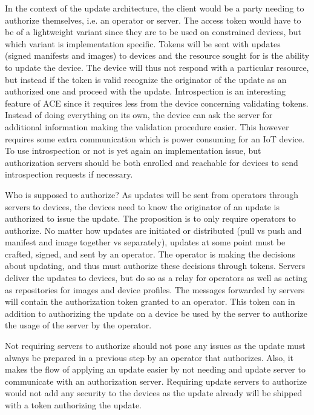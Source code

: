 \documentclass[0-thesis.tex]{subfiles}
\begin{document}
In the context of the update architecture, the client would be a party needing to
authorize themselves, i.e. an operator or server. The access token would have to be of a
lightweight variant since they are to be used on constrained devices, but which variant is
implementation specific. Tokens will be sent with updates (signed manifests and images) to
devices and the resource sought for is the ability to update the device. The device will
thus not respond with a particular resource, but instead if the token is valid recognize
the originator of the update as an authorized one and proceed with the update.
Introspection is an interesting feature of ACE since it requires less from the device
concerning validating tokens. Instead of doing everything on its own, the device can ask
the server for additional information making the validation procedure easier. This however
requires some extra communication which is power consuming for an IoT device. To use
introspection or not is yet again an implementation issue, but authorization servers
should be both enrolled and reachable for devices to send introspection requests if
necessary.

Who is supposed to authorize? As updates will be sent from operators through servers to
devices, the devices need to know the originator of an update is authorized to issue the
update. The proposition is to only require operators to authorize. No matter how updates
are initiated or distributed (pull vs push and manifest and image together vs separately),
updates at some point must be crafted, signed, and sent by an operator. The operator is
making the decisions about updating, and thus must authorize these decisions through
tokens. Servers deliver the updates to devices, but do so as a relay for operators as
well as acting as repositories for images and device profiles. The messages forwarded by
servers will contain the authorization token granted to an operator. This token can in
addition to authorizing the update on a device be used by the server to authorize the
usage of the server by the operator. 

Not requiring servers to authorize should not pose any issues as the update must always be
prepared in a previous step by an operator that authorizes. Also, it makes the flow of
applying an update easier by not needing and update server to communicate with an
authorization server. Requiring update servers to authorize would not add any security to
the devices as the update already will be shipped with a token authorizing the update.
\end{document}
